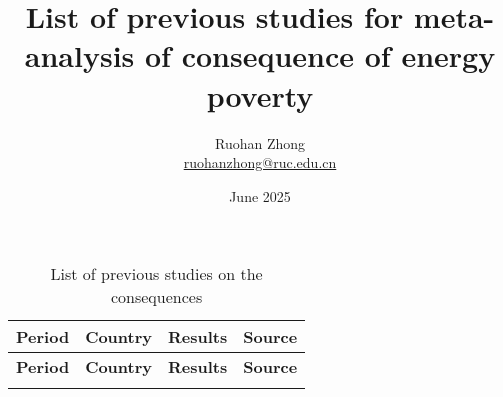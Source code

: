 \documentclass{article}
\title{List of previous studies for meta-analysis of consequence of energy poverty}
\author{Ruohan Zhong\\ \href{mailto:ruohanzhong@ruc.edu.cn}{ruohanzhong@ruc.edu.cn}}
\date{June 2025}
\begin{document}
\maketitle

\newpage

\begin{xltabular}{\textwidth}{
    >{\RaggedRight}p{1.4cm} 
    >{\RaggedRight}p{1.7cm}
    >{\noindent\arraybackslash}X
    >{\RaggedRight}p{2cm}
}

\caption{List of previous studies on the consequences}
\label{tab_list_consequence}\\
\hline
\textbf{Period} & \textbf{Country} & \textbf{Results} & \textbf{Source}\\
\hline
\endfirsthead
\hline
\textbf{Period} & \textbf{Country} & \textbf{Results} & \textbf{Source}\\
\hline
\endhead
\hline
{}
\endfoot
\hline
\endlastfoot


\end{xltabular}
\end{document}
